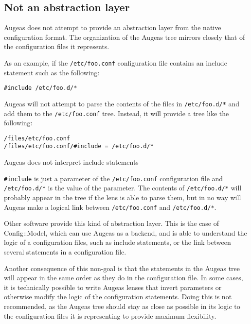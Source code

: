 \subsection{Not an abstraction layer}

Augeas does not attempt to provide an abstraction layer from the native configuration format. The organization of the Augeas tree mirrors closely that of the configuration files it represents.

As an example, if the \verb!/etc/foo.conf! configuration file contains an include statement such as the following:

\begin{verbatim}
#include /etc/foo.d/*
\end{verbatim}

Augeas will not attempt to parse the contents of the files in \verb!/etc/foo.d/*! and add them to the \verb!/etc/foo.conf! tree. Instead, it will provide a tree like the following:

\begin{listing}
  \begin{verbatim}
/files/etc/foo.conf
/files/etc/foo.conf/#include = /etc/foo.d/*
  \end{verbatim}
  \caption{Augeas does not interpret include statements}
  \label{lst:intro_include_tree}
\end{listing}

\verb!#include! is just a parameter of the \verb!/etc/foo.conf! configuration file and \verb!/etc/foo.d/*! is the value of the parameter. The contents of \verb!/etc/foo.d/*! will probably appear in the tree if the lens is able to parse them, but in no way will Augeas make a logical link between \verb!/etc/foo.conf! and \verb!/etc/foo.d/*!.

Other software provide this kind of abstraction layer. This is the case of Config::Model, which can use Augeas as a backend, and is able to understand the logic of a configuration files, such as include statements, or the link between several statements in a configuration file.

Another consequence of this non-goal is that the statements in the Augeas tree will appear in the same order as they do in the configuration file. In some cases, it is technically possible to write Augeas lenses that invert parameters or otherwise modify the logic of the configuration statements. Doing this is not recommended, as the Augeas tree should stay as close as possible in its logic to the configuration files it is representing to provide maximum flexibility.

